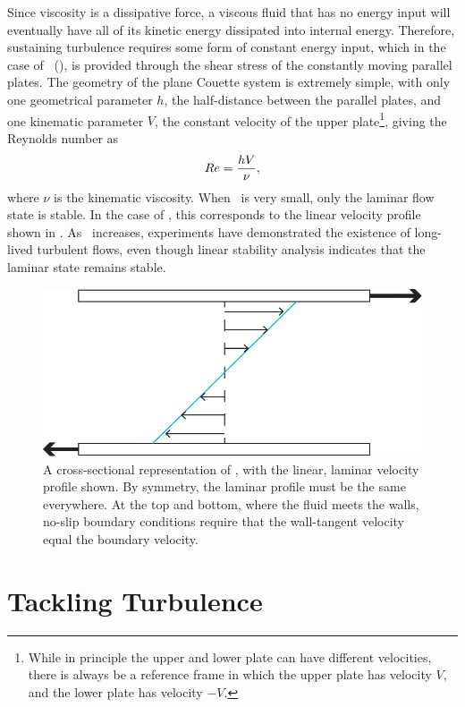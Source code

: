 Since viscosity is a dissipative force, a viscous fluid that has no energy input will eventually have all of its kinetic energy dissipated into internal energy. Therefore, sustaining turbulence requires some form of constant energy input, which in the case of \pCf\ (), is provided through the shear stress of the constantly moving parallel plates. The geometry of the plane Couette system is extremely simple, with only one geometrical parameter $h$, the half-distance between the parallel plates, and one kinematic parameter $V$, the constant velocity of the upper plate\footnote{While in principle the upper and lower plate can have different velocities, there is always be a reference frame in which the upper plate has velocity $V$, and the lower plate has velocity $-V$.}, giving the Reynolds number as 
\begin{equation}
Re = \dfrac{hV}{\nu},
\end{equation}
where $\nu$ is the kinematic viscosity. When \ReN~is very small, only the laminar flow state is stable. In the case of \pCf, this corresponds to the linear velocity profile shown in . As \ReN~increases, experiments have demonstrated the existence of long-lived turbulent flows, even though linear stability analysis indicates that the laminar state remains stable.
\begin{figure}
\centerline{
\includegraphics[scale=0.6]{Figs/planeCouetteMeanFlow}}
\caption{A cross-sectional representation of \pCf, with the linear, laminar velocity profile shown. By symmetry, the laminar profile must be the same everywhere. At the top and bottom, where the fluid meets the walls, no-slip boundary conditions require that the wall-tangent velocity equal the boundary velocity.}\label{fig:planeCouetteBulk}
\end{figure}

\section{Tackling Turbulence} 

